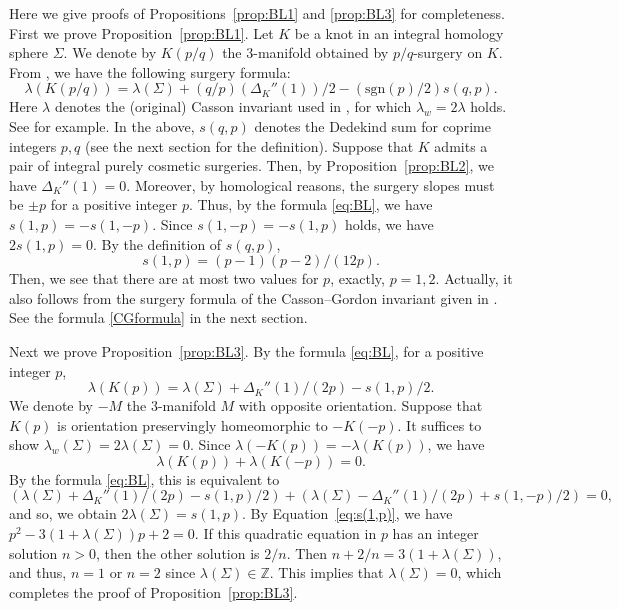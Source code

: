 \documentclass{amsart}
\theoremstyle{remark}
\begin{document}
Here we give proofs of Propositions~\ref{prop:BL1} and \ref{prop:BL3} for completeness. 
First we prove Proposition~\ref{prop:BL1}. 
Let $K$ be a knot in an integral homology sphere $\Sigma$. 
We denote by $K (p/q)$ the 3-manifold obtained by $p/q$-surgery on $K$. 
From \cite[Theorem 2.8]{BoyerLines}, we have the following surgery formula:
\begin{equation}\label{eq:BL}
\lambda (K (p/q)) = \lambda (\Sigma) +(q/p) (\Delta_K''(1))/2 - (\mathrm{sgn} (p)/2) s(q, p).
\end{equation}
Here $\lambda$ denotes the (original) Casson invariant used in \cite{BoyerLines}, for which $\lambda_w = 2 \lambda$ holds. 
See \cite[Section 6]{Lescop} for example. 
In the above, $s(q,p)$ denotes the Dedekind sum for coprime integers $p,q$ (see the next section for the definition). 
Suppose that $K$ admits a pair of integral purely cosmetic surgeries. 
Then, by Proposition~\ref{prop:BL2}, we have $\Delta_K''(1)=0$. 
Moreover, by homological reasons, the surgery slopes must be $\pm p$ for a positive integer $p$. 
Thus, by the formula \eqref{eq:BL}, we have $s(1, p) = -s(1, -p)$. 
Since $s(1, -p) = -s(1,p)$ holds, we have $2 s(1, p) = 0$. 
By the definition of $s(q,p)$, 
\begin{equation}\label{eq:s(1,p)} 
s(1,p) = (p-1)(p-2)/(12p). 
\end{equation}
Then, we see that there are at most two values for $p$, exactly, $p = 1,2$. 
Actually, it also follows from the surgery formula of the Casson--Gordon invariant given in \cite[Lemma 2.22]{BoyerLines}. 
See the formula \eqref{CGformula} in the next section. 

Next we prove Proposition~\ref{prop:BL3}. 
By the formula \eqref{eq:BL}, for a positive integer $p$, 
\[ \lambda (K(p)) = \lambda (\Sigma) + \Delta_K''(1)/(2p) - s(1,p)/2. \]
We denote by $-M$ the $3$-manifold $M$ with opposite orientation. 
Suppose that $K(p)$ is orientation preservingly homeomorphic to $-K(-p)$. 
It suffices to show $\lambda_w (\Sigma) = 2 \lambda (\Sigma) = 0$. 
Since $\lambda (-K(p)) = -\lambda (K(p))$, we have 
\[\lambda (K(p)) + \lambda (K(-p)) =0.\]
By the formula \eqref{eq:BL}, this is equivalent to 
\[(\lambda (\Sigma) + \Delta_K''(1)/(2p) - s(1,p)/2) + (\lambda (\Sigma) - \Delta_K''(1)/(2p) + s(1,-p)/2) = 0,\]
and so, we obtain $2\lambda (\Sigma) = s(1,p)$. 
By Equation~\eqref{eq:s(1,p)}, we have $p^2 - 3\left(1 + \lambda(\Sigma) \right)p + 2 = 0$. 
If this quadratic equation in $p$ has an integer solution $n > 0$, then the other solution is $2/n$. 
Then $n + 2/n = 3\left(1 + \lambda(\Sigma) \right)$, and thus, $n = 1$ or $n=2$ since $\lambda(\Sigma) \in \mathbb{Z}$. 
This implies that $\lambda(\Sigma)=0$, which completes the proof of Proposition~\ref{prop:BL3}. 
\end{document}
